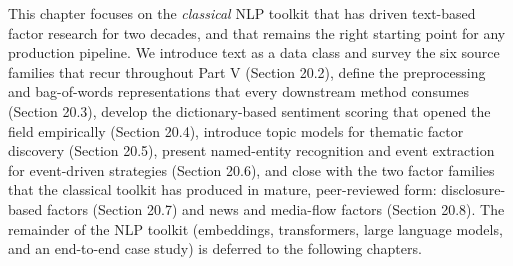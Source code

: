 This chapter focuses on the \textit{classical} NLP toolkit that has driven text-based factor research for two decades, and that remains the right starting point for any production pipeline. We introduce text as a data class and survey the six source families that recur throughout Part V (Section 20.2), define the preprocessing and bag-of-words representations that every downstream method consumes (Section 20.3), develop the dictionary-based sentiment scoring that opened the field empirically (Section 20.4), introduce topic models for thematic factor discovery (Section 20.5), present named-entity recognition and event extraction for event-driven strategies (Section 20.6), and close with the two factor families that the classical toolkit has produced in mature, peer-reviewed form: disclosure-based factors (Section 20.7) and news and media-flow factors (Section 20.8). The remainder of the NLP toolkit (embeddings, transformers, large language models, and an end-to-end case study) is deferred to the following chapters.

